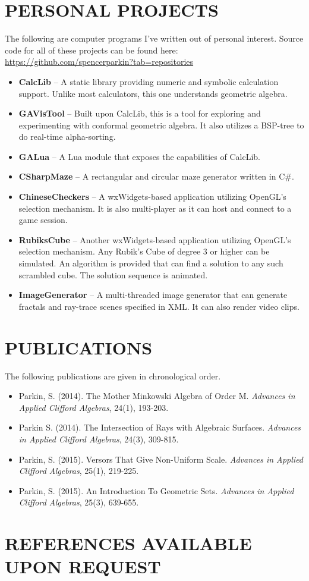 \documentclass[margin]{res}
\begin{document}
\begin{resume}
\section{PERSONAL PROJECTS}
		The following are computer programs I've written out of personal interest.  Source code for all of these projects can be found here: \url{https://github.com/spencerparkin?tab=repositories}
		\begin{itemize}\itemsep -2pt %
		\item \textbf{CalcLib} -- A static library providing numeric and symbolic calculation support.  Unlike most calculators, this one understands geometric algebra.
		\item \textbf{GAVisTool} -- Built upon CalcLib, this is a tool for exploring and experimenting with conformal geometric algebra.  It also utilizes a BSP-tree to do real-time alpha-sorting.
		\item \textbf{GALua} -- A Lua module that exposes the capabilities of CalcLib.
		\item \textbf{CSharpMaze} -- A rectangular and circular maze generator written in C\#.
		\item \textbf{ChineseCheckers} -- A wxWidgets-based application utilizing OpenGL's selection mechanism.  It is also multi-player as it can host and connect to a game session.
		\item \textbf{RubiksCube} -- Another wxWidgets-based application utilizing OpenGL's selection mechanism.  Any Rubik's Cube of degree 3 or higher can be simulated.  An algorithm is provided that can find a solution to any such scrambled cube.  The solution sequence is animated.
		\item \textbf{ImageGenerator} -- A multi-threaded image generator that can generate fractals and ray-trace scenes specified in XML.  It can also render video clips.
		\end{itemize}

\section{PUBLICATIONS}
		The following publications are given in chronological order.
		\begin{itemize}\itemsep -2pt %
		\item Parkin, S. (2014).  The Mother Minkowski Algebra of Order M.  {\it Advances in Applied Clifford Algebras}, 24(1), 193-203.
		\item Parkin S.  (2014).  The Intersection of Rays with Algebraic Surfaces.  {\it Advances in Applied Clifford Algebras}, 24(3), 309-815.
		\item Parkin, S.  (2015).  Versors That Give Non-Uniform Scale.  {\it Advances in Applied Clifford Algebras}, 25(1), 219-225.
		\item Parkin, S.  (2015).  An Introduction To Geometric Sets.  {\it Advances in Applied Clifford Algebras}, 25(3), 639-655.
		\end{itemize}

\section{REFERENCES AVAILABLE UPON REQUEST}

\end{resume}
\end{document}
